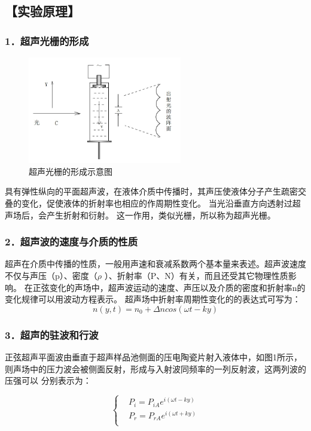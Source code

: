 \documentclass[12pt,a4paper,UTF8]{ctexart}
\begin{document}
\subsection*{【实验原理】}
\subsubsection*{1．超声光栅的形成}

\begin{figure}[htbp]
	\centering
	\includegraphics[width=0.6\textwidth]{img//1.jpg}
	\caption{超声光栅的形成示意图}
\end{figure}

具有弹性纵向的平面超声波，在液体介质中传播时，其声压使液体分子产生疏密交叠的变化，促使液体的折射率也相应的作周期性变化。
当光沿垂直方向透射过超声场后，会产生折射和衍射。
这一作用，类似光栅，所以称为超声光栅。

\subsubsection*{2．超声波的速度与介质的性质}
超声在介质中传播的性质，一般用声速和衰减系数两个基本量来表述。超声波速度不仅与声压（p）、密度（$\rho$ ）、折射率（P、N）有关，而且还受其它物理性质影响。
在正弦变化的声场中，超声波运动的速度、声压以及介质的密度和折射率n的变化规律可以用波动方程表示。
超声场中折射率周期性变化的的表达式可写为：
\begin{equation}
	n(y,t)=n_0+\varDelta n cos(\omega t-ky)
\end{equation}

\subsubsection*{3．超声的驻波和行波}
正弦超声平面波由垂直于超声样品池侧面的压电陶瓷片射入液体中，如图1所示，则声场中的压力波会被侧面反射，形成与入射波同频率的一列反射波，这两列波的压强可以
分别表示为：

\begin{equation}
	\begin{cases}
		&P_i=P_{iA}e^{i(\omega t-ky)} \\
		&P_r=P_{rA}e^{i(\omega t+ky)}\\
	\end{cases}
\end{equation}
\end{document}
